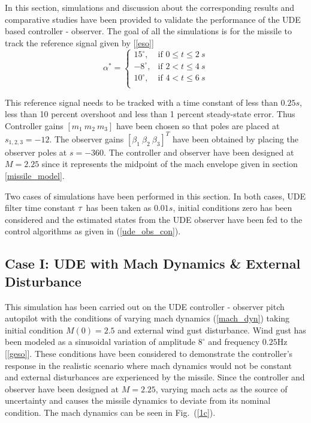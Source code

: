 \documentclass[conference]{IEEEtran}
\begin{document}
	In this section, simulations and discussion about the corresponding results and comparative studies have been provided to validate the performance of the UDE based controller - observer. The goal of all the simulations is for the missile to track the reference signal given by [\ref{eso}]
	\begin{equation}
		\alpha^{*}=
		\begin{cases}
			15^{\circ}, & \text{if $0 \leq t \leq2 ~ s$}\\
			-8^{\circ}, & \text{if $2 < t \leq4 ~ s$}\\
			10^{\circ}, & \text{if $4 < t \leq6 ~ s$} \label{ref_sig}\\ 
		\end{cases}
	\end{equation}
	
	This reference signal needs to be tracked with a time constant of less than $0.25s$, less than 10 percent overshoot and less than 1 percent steady-state error. Thus Controller gains $[m_1\ m_2 \ m_3]$ have been chosen so that poles are placed at $s_{1,2,3} = -12$. The observer gains $[\beta_1 \ \beta_2 \ \beta_3]^T$ have been obtained by placing the observer poles at $s = -360$. The controller and observer have been designed at $M = 2.25$ since it represents the midpoint of the mach envelope given in section \ref{missile_model}.
	
	Two cases of simulations have been performed in this section. In both cases, UDE filter time constant $\mathlarger{\tau}$ has been taken as $0.01s$, initial conditions zero has been considered and the estimated states from the UDE observer have been fed to the control algorithms as given in (\ref{ude_obs_con}). 
	
	\subsection*{Case I: UDE with Mach Dynamics \& External Disturbance}
	
		This simulation has been carried out on the UDE controller - observer pitch autopilot with the conditions of varying mach dynamics (\ref{mach_dyn}) taking initial condition $M(0) = 2.5$ and external wind gust disturbance. Wind gust has been modeled as a sinusoidal variation of amplitude $8^\circ$ and frequency $0.25$Hz [\ref{geso}]. These conditions have been considered to demonstrate the controller's response in the realistic scenario where mach dynamics would not be constant and external disturbances are experienced by the missile. Since the controller and observer have been designed at $M = 2.25$, varying mach acts as the source of uncertainty and causes the missile dynamics to deviate from its nominal condition. The mach dynamics can be seen in Fig.~(\ref{1c}).
		
\end{document}
